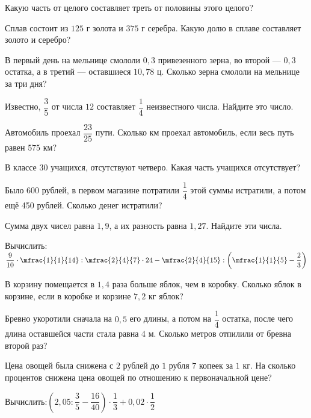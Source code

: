 %
%
\begin{homework}[number=3]
	\begin{listofex}
		\item Какую часть от целого составляет треть от половины этого целого?
		\item Сплав состоит из \(125\) г золота и \(375\) г серебра. Какую долю в сплаве составляет золото и серебро?
		\item В первый день на мельнице смололи \(0,3\) привезенного зерна, во второй --- \(0,3\) остатка, а в третий --- оставшиеся \(10,78\) ц. Сколько зерна смололи на мельнице за три дня?
		\item Известно, \(\dfrac{3}{5}\) от числа \(12\) составляет \(\dfrac{1}{4}\) неизвестного числа. Найдите это число.
		\item Автомобиль проехал \(\dfrac{23}{25}\) пути. Сколько км проехал автомобиль, если весь путь равен \(575\) км?
		
		\item В классе  \(30\)  учащихся, отсутствуют четверо. Какая часть учащихся отсутствует?
		\item Было  \(600\)  рублей, в первом магазине потратили \(\dfrac{1}{4}\) этой суммы истратили, а потом ещё 450 рублей. Сколько денег истратили?
		\item Сумма двух чисел равна \(1,9\), а их разность равна \(1,27\). Найдите эти числа.
		\item Вычислить:\quad\( \dfrac{9}{10} \cdot \mfrac{1}{1}{14} : \mfrac{2}{4}{7} \cdot 24 - \mfrac{2}{4}{15} : \left( \mfrac{1}{1}{5} - \dfrac{2}{3} \right) \)
	\end{listofex}
\end{homework}

%
%
\begin{class}[number=7]
	\begin{listofex}
		\item В корзину помещается в \(1,4\) раза больше яблок, чем в коробку. Сколько яблок в корзине, если в коробке и корзине \( 7,2\) кг яблок?
		\item Бревно укоротили сначала на \(0,5\) его длины, а потом на \(\dfrac{1}{4}\) остатка, после чего длина оставшейся части стала равна \(4\) м. Сколько метров отпилили от бревна второй раз?
		\item Цена овощей была снижена с \(2\) рублей до \(1\) рубля \(7\) копеек за \(1\) кг. На сколько процентов снижена цена овощей по отношению к первоначальной цене?
		\item Вычислить:\quad\(\left(2,05:\dfrac{3}{5}-\dfrac{16}{40}\right) \cdot \dfrac{1}{3} + 0,02 \cdot \dfrac{1}{2}\)
	\end{listofex}
\end{class}


